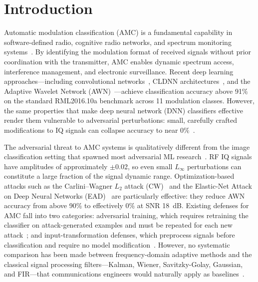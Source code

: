 \section{Introduction}
\label{sec:intro}

Automatic modulation classification (AMC) is a fundamental capability in
software-defined radio, cognitive radio networks, and spectrum monitoring
systems~\cite{dobre2007survey,hazza2013overview}. By identifying the
modulation format of received signals without prior coordination with the
transmitter, AMC enables dynamic spectrum access, interference management,
and electronic surveillance. Recent deep learning approaches---including
convolutional networks~\cite{otoole2016rml}, CLDNN architectures~\cite{zhang2023cldnn},
and the Adaptive Wavelet Network (AWN)~\cite{li2023awn}---achieve classification
accuracy above 91\% on the standard RML2016.10a benchmark across 11 modulation
classes. However, the same properties that make deep neural network (DNN)
classifiers effective render them vulnerable to adversarial perturbations:
small, carefully crafted modifications to IQ signals can collapse accuracy
to near 0\%~\cite{szegedy2014intriguing,silvaco2023adversarial_rf,lin2020tactics}.

The adversarial threat to AMC systems is qualitatively different from the
image classification setting that spawned most adversarial ML
research~\cite{goodfellow2015fgsm,madry2018pgd}. RF IQ signals have amplitudes
of approximately $\pm$0.02, so even small $L_\infty$ perturbations can constitute
a large fraction of the signal dynamic range. Optimization-based attacks such
as the Carlini--Wagner $L_2$ attack (CW)~\cite{carlini2017towards} and the
Elastic-Net Attack on Deep Neural Networks
(EAD)~\cite{chen2020ead} are particularly effective: they reduce AWN accuracy
from above 90\% to effectively 0\% at SNR 18~dB. Existing defenses for AMC
fall into two categories: adversarial training, which requires retraining the
classifier on attack-generated examples and must be repeated for each new
attack~\cite{madry2018towards,tramer2017ensemble}; and input-transformation
defenses, which preprocess signals before classification and require no model
modification~\cite{guo2018input,xu2018feature}. However, no systematic
comparison has been made between frequency-domain adaptive methods and the
classical signal processing filters---Kalman, Wiener, Savitzky-Golay, Gaussian,
and FIR---that communications engineers would naturally apply as
baselines~\cite{haykin2002adaptive,proakis2006digital}.

